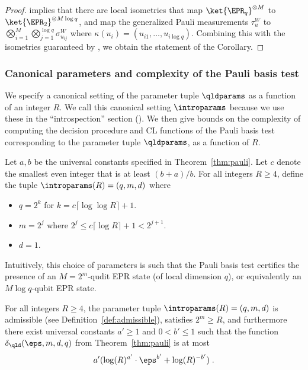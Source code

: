 \begin{proof}
 implies that there are local isometries that map $\ket{\EPR_q}^{\otimes M}$ to $\ket{\EPR_2}^{\otimes M\log q}$, and map the generalized Pauli measurements $\tau^W_u$ to $\bigotimes_{i=1}^M \bigotimes_{j=1}^{\log q} \sigma^W_{u_{ij}}$ where $\kappa(u_i) = (u_{i1},\ldots,u_{i\log q})$. Combining this with the isometries guaranteed by , we obtain the statement of the Corollary.
\end{proof}
\subsubsection{Canonical parameters and complexity of the Pauli basis test}
\label{sec:qld-complexity}

We specify a canonical setting of the parameter tuple $\qldparams$ as a function
of an integer $R$.
We call this canonical setting $\introparams$ because we use these in the
``introspection'' section ().
We then give bounds on the complexity of computing the decision procedure and CL
functions of the Pauli basis test corresponding to the parameter tuple
$\qldparams$, as a function of $R$.

\begin{definition}
  \label{def:introparams}
  Let $a,b$ be the universal constants specified in Theorem~\ref{thm:pauli}.
  Let $c$ denote the smallest even integer that is at least $(b + a)/b$.
  For all integers $R \geq 4$, define the tuple $\introparams(R) = (q,m,d)$
  where
  \begin{itemize}
  	\item $q = 2^k$ for $k = c \lceil  \log \log R  \rceil + 1$.
	\item $m = 2^j$ where $2^j \leq c \lceil \log R \rceil + 1 < 2^{j+1}$. 
	\item $d = 1$. 
  \end{itemize}
\end{definition}

Intuitively, this choice of parameters is such that the Pauli basis test
certifies the presence of an $M=2^m$-qudit EPR state (of local dimension $q$), or
equivalently an $M\log q$-qubit EPR state.

\begin{lemma}
  \label{lem:delta-bound}
 For all integers $R \geq 4$, the parameter tuple $\introparams(R) = (q,m,d)$ is
  admissible (see Definition~\ref{def:admissible}), satisfies $2^m \geq R$, and furthermore there exist
  universal constants $a'\geq 1$ and $0 < b' \leq 1$ such that the function
  $\delta_\qld(\eps, m, d, q)$ from Theorem~\ref{thm:pauli} is at most
   \[
   	a' ( \log(R)^{a'} \cdot \eps^{b'} + \log(R)^{-b'}) \;.
	\]
\end{lemma}


